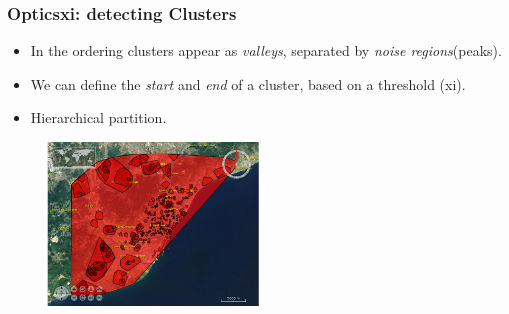 \documentclass[hyperref={pdfpagelabels=true}]{beamer}
\begin{document}
\begin{frame}
\frametitle{Opticsxi: detecting Clusters}
\begin{itemize}
      \item<2->In the ordering clusters appear as \textit{valleys}, separated by \textit{noise regions}(peaks). 
      \item<3->We can define the \textit{start} and \textit{end} of a cluster, based on a threshold (xi).%
      \item<4->Hierarchical partition.%
\end{itemize}                
  \begin{figure}   
    \includegraphics[width=0.5\textwidth]{2000_025_100_w_removal.png}   
  \end{figure}     
\end{frame}
\end{document}
